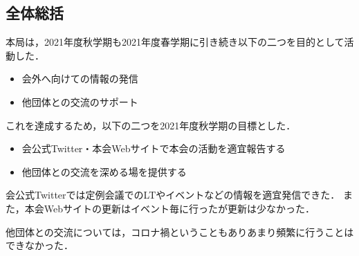 \subsection*{全体総括}


本局は，2021年度秋学期も2021年度春学期に引き続き以下の二つを目的として活動した．
\begin{itemize}
    \item 会外へ向けての情報の発信
    \item 他団体との交流のサポート
\end{itemize}
これを達成するため，以下の二つを2021年度秋学期の目標とした．
\begin{itemize}
    \item 会公式Twitter・本会Webサイトで本会の活動を適宜報告する
    \item 他団体との交流を深める場を提供する
\end{itemize}

会公式Twitterでは定例会議でのLTやイベントなどの情報を適宜発信できた．
また，本会Webサイトの更新はイベント毎に行ったが更新は少なかった．

他団体との交流については，コロナ禍ということもありあまり頻繁に行うことはできなかった．
